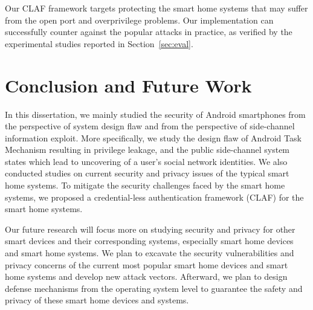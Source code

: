 \documentclass[letterpaper,12pt]{article}
\begin{document}
Our CLAF framework targets protecting the smart home systems that may suffer from the open port and overprivilege problems. Our implementation can successfully counter against the popular attacks in practice, as verified by the experimental studies reported in Section~\ref{sec:eval}.

\section{Conclusion and Future Work}\label{sec:conclusion}
In this dissertation, we mainly studied the security of Android smartphones from the perspective of system design flaw and from the perspective of side-channel information exploit. More specifically, we study the design flaw of Android Task Mechanism resulting in privilege leakage, and the public side-channel system states which lead to uncovering of a user's social network identities. We also conducted studies on current security and privacy issues of the typical smart home systems. To mitigate the security challenges faced by the smart home systems, we proposed a credential-less authentication framework (CLAF) for the smart home systems.

Our future research will focus more on studying security and privacy for other smart devices and their corresponding systems, especially smart home devices and smart home systems. We plan to excavate the security vulnerabilities and privacy concerns of the current most popular smart home devices and smart home systems and develop new attack vectors. Afterward, we plan to design defense mechanisms from the operating system level to guarantee the safety and privacy of these smart home devices and systems. 

        \newpage
   
   
\end{document}
